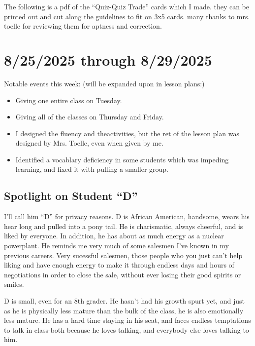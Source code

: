 \documentclass[11pt]{elegantbook}
\begin{document}




The following is a pdf of the ``Quiz-Quiz Trade'' cards which I made.
they can be printed out and cut along the guidelines to fit on 3x5
cards.  many thanks to mrs. toelle for reviewing them for aptness and
correction.



\chapter{8/25/2025 through 8/29/2025}

Notable events this week: (will be expanded upon in lesson plans:)

\begin{itemize}
  
\item Giving one entire class on Tuesday.
  
\item Giving all of the classes on Thursday and Friday.
  
\item I designed the fluency and theactivities, but the ret of the
  lesson plan was designed by Mrs. Toelle, even when given by me.
  
\item Identified a vocablary deficiency in some students which was
  impeding learning, and fixed it with pulling a smaller group.
  
\end{itemize}

\section{Spotlight on Student ``D''}

I'll call him ``D'' for privacy reasons.  D is African American,
handsome, wears his hear long and pulled into a pony tail.  He is
charismatic, always cheerful, and is liked by everyone.  In addition,
he has about as much energy as a nuclear powerplant.  He reminds me
very much of some salesmen I've known in my previous careers.  Very
sucessful salesmen, those people who you just can't help liking and
have enough energy to make it through endless days and hours of
negotiations in order to close the sale, without ever losing their
good spirits or smiles.

D is small, even for an 8th grader.  He hasn't had his growth spurt
yet, and just as he is physically less mature than the bulk of the
class, he is also emotionally less mature.  He has a hard time staying
in his seat, and faces endless temptations to talk in class-both
because he loves talking, and everybody else loves talking to him.
\end{document}
